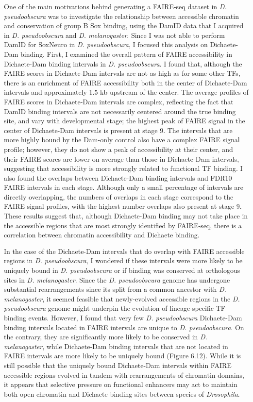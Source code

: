 One of the main motivations behind generating a FAIRE-seq dataset in \emph{D. pseudoobscura} was to investigate the relationship between accessible chromatin and conservation of group B Sox binding, using the DamID data that I acquired in \emph{D. pseudoobscura} and \emph{D. melanogaster}. Since I was not able to perform DamID for SoxNeuro in \emph{D. pseudoobscura}, I focused this analysis on Dichaete-Dam binding. First, I examined the overall pattern of FAIRE accessibility in Dichaete-Dam binding intervals in \emph{D. pseudoobscura}. I found that, although the FAIRE scores in Dichaete-Dam intervals are not as high as for some other TFs, there is an enrichment of FAIRE accessibility both in the center of Dichaete-Dam intervals and approximately 1.5 kb upstream of the center. The average profiles of FAIRE scores in Dichaete-Dam intervals are complex, reflecting the fact that DamID binding intervals are not necessarily centered around the true binding site, and vary with developmental stage; the highest peak of FAIRE signal in the center of Dichaete-Dam intervals is present at stage 9. The intervals that are more highly bound by the Dam-only control also have a complex FAIRE signal profile; however, they do not show a peak of accessibility at their center, and their FAIRE scores are lower on average than those in Dichaete-Dam intervals, suggesting that accessibility is more strongly related to functional TF binding. I also found the overlaps between Dichaete-Dam binding intervals and FDR10 FAIRE intervals in each stage. Although only a small percentage of intervals are directly overlapping, the numbers of overlaps in each stage correspond to the FAIRE signal profiles, with the highest number overlaps also present at stage 9. These results suggest that, although Dichaete-Dam binding may not take place in the accessible regions that are most strongly identified by FAIRE-seq, there is a correlation between chromatin accessibility and Dichaete binding.

In the case of the Dichaete-Dam intervals that do overlap with FAIRE accessible regions in \emph{D. pseudoobscura}, I wondered if these intervals were more likely to be uniquely bound in \emph{D. pseudoobscura} or if binding was conserved at orthologous sites in \emph{D. melanogaster}. Since the \emph{D. pseudoobscura} genome has undergone substantial rearrangements since its split from a common ancestor with \emph{D. melanogaster}, it seemed feasible that newly-evolved accessible regions in the \emph{D. pseudoobscura} genome might underpin the evolution of lineage-specific TF binding events. However, I found that very few \emph{D. pseudoobscura} Dichaete-Dam binding intervals located in FAIRE intervals are unique to \emph{D. pseudoobscura}. On the contrary, they are significantly more likely to be conserved in \emph{D. melanogaster}, while Dichaete-Dam binding intervals that are not located in FAIRE intervals are more likely to be uniquely bound (Figure 6.12). While it is still possible that the uniquely bound Dichaete-Dam intervals within FAIRE accessible regions evolved in tandem with rearrangements of chromatin domains, it appears that selective pressure on functional enhancers may act to maintain both open chromatin and Dichaete binding sites between species of \emph{Drosophila}.


